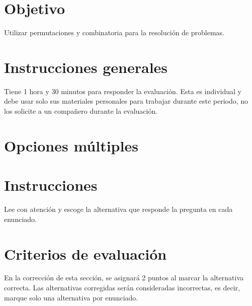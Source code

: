 \documentclass[]{srs}
\begin{document}
\section*{Objetivo}
  Utilizar permutaciones y combinatoria para la resolución de problemas.

\section*{Instrucciones generales}
  Tiene 1 hora y 30 minutos para responder la evaluación. Esta es individual y debe
  usar solo sus materiales personales para trabajar durante este periodo, no los solicite
  a un compañero durante la evaluación.

\section{Opciones múltiples}

\section*{Instrucciones}
Lee con atención y escoge la alternativa que responde la pregunta en cada enunciado.

\section*{Criterios de evaluación}
En la corrección de esta sección, se asignará 2 puntos al marcar la alternativa correcta.
Las alternativas corregidas serán consideradas incorrectas, es decir, marque solo una
alternativa por enunciado.

\separador[2mm]
\end{document}

